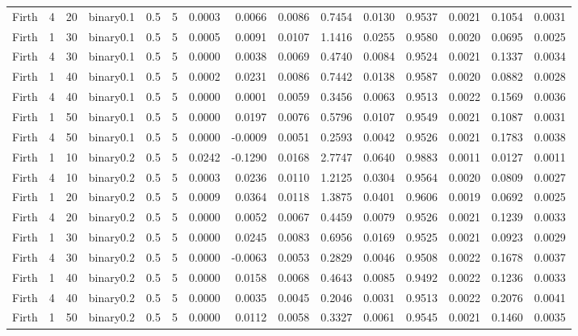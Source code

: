 \begin{longtable}{rrrrrrrrrrrrrrr}
  Firth & 4 & 20 & binary0.1 & 0.5 & 5 & 0.0003 & 0.0066 & 0.0086 & 0.7454 & 0.0130 & 0.9537 & 0.0021 & 0.1054 & 0.0031 \\ 
  Firth & 1 & 30 & binary0.1 & 0.5 & 5 & 0.0005 & 0.0091 & 0.0107 & 1.1416 & 0.0255 & 0.9580 & 0.0020 & 0.0695 & 0.0025 \\ 
  Firth & 4 & 30 & binary0.1 & 0.5 & 5 & 0.0000 & 0.0038 & 0.0069 & 0.4740 & 0.0084 & 0.9524 & 0.0021 & 0.1337 & 0.0034 \\ 
  Firth & 1 & 40 & binary0.1 & 0.5 & 5 & 0.0002 & 0.0231 & 0.0086 & 0.7442 & 0.0138 & 0.9587 & 0.0020 & 0.0882 & 0.0028 \\ 
  Firth & 4 & 40 & binary0.1 & 0.5 & 5 & 0.0000 & 0.0001 & 0.0059 & 0.3456 & 0.0063 & 0.9513 & 0.0022 & 0.1569 & 0.0036 \\ 
  Firth & 1 & 50 & binary0.1 & 0.5 & 5 & 0.0000 & 0.0197 & 0.0076 & 0.5796 & 0.0107 & 0.9549 & 0.0021 & 0.1087 & 0.0031 \\ 
  Firth & 4 & 50 & binary0.1 & 0.5 & 5 & 0.0000 & -0.0009 & 0.0051 & 0.2593 & 0.0042 & 0.9526 & 0.0021 & 0.1783 & 0.0038 \\ 
  Firth & 1 & 10 & binary0.2 & 0.5 & 5 & 0.0242 & -0.1290 & 0.0168 & 2.7747 & 0.0640 & 0.9883 & 0.0011 & 0.0127 & 0.0011 \\ 
  Firth & 4 & 10 & binary0.2 & 0.5 & 5 & 0.0003 & 0.0236 & 0.0110 & 1.2125 & 0.0304 & 0.9564 & 0.0020 & 0.0809 & 0.0027 \\ 
  Firth & 1 & 20 & binary0.2 & 0.5 & 5 & 0.0009 & 0.0364 & 0.0118 & 1.3875 & 0.0401 & 0.9606 & 0.0019 & 0.0692 & 0.0025 \\ 
  Firth & 4 & 20 & binary0.2 & 0.5 & 5 & 0.0000 & 0.0052 & 0.0067 & 0.4459 & 0.0079 & 0.9526 & 0.0021 & 0.1239 & 0.0033 \\ 
  Firth & 1 & 30 & binary0.2 & 0.5 & 5 & 0.0000 & 0.0245 & 0.0083 & 0.6956 & 0.0169 & 0.9525 & 0.0021 & 0.0923 & 0.0029 \\ 
  Firth & 4 & 30 & binary0.2 & 0.5 & 5 & 0.0000 & -0.0063 & 0.0053 & 0.2829 & 0.0046 & 0.9508 & 0.0022 & 0.1678 & 0.0037 \\ 
  Firth & 1 & 40 & binary0.2 & 0.5 & 5 & 0.0000 & 0.0158 & 0.0068 & 0.4643 & 0.0085 & 0.9492 & 0.0022 & 0.1236 & 0.0033 \\ 
  Firth & 4 & 40 & binary0.2 & 0.5 & 5 & 0.0000 & 0.0035 & 0.0045 & 0.2046 & 0.0031 & 0.9513 & 0.0022 & 0.2076 & 0.0041 \\ 
  Firth & 1 & 50 & binary0.2 & 0.5 & 5 & 0.0000 & 0.0112 & 0.0058 & 0.3327 & 0.0061 & 0.9545 & 0.0021 & 0.1460 & 0.0035 \\ 

\end{longtable}

